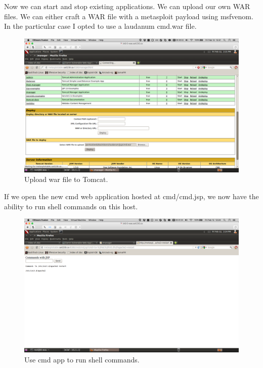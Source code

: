 \documentclass{article}
\begin{document}
\newpage
Now we can start and stop existing applications. We can upload our own WAR files.
We can either craft a WAR file with a metasploit payload using msfvenom. In the 
particular case I opted to use a laudanum cmd.war file.


\begin{figure}[h!]
	\includegraphics[width=\linewidth]{images/tomcat-metasploitable-upload.png}
	\caption{Upload war file to Tomcat.}
	\label{fig:tomcat-injection4}
\end{figure}

\newpage
If we open the new cmd web application hosted at cmd/cmd.jsp, we now have the
ability to run shell commands on this host.

\begin{figure}[h!]
	\includegraphics[width=\linewidth]{images/tomcat-metasploitable-cmd.png}
	\caption{Use cmd app to run shell commands.}
	\label{fig:tomcat-injection5}
\end{figure}
\end{document}
